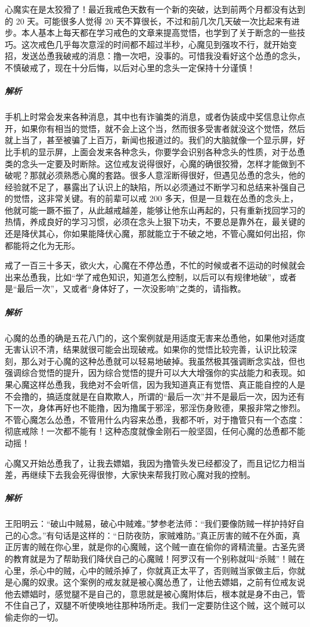 \begin{case}[脑中的短信]
    心魔实在是太狡猾了！最近我戒色天数有一个新的突破，达到前两个月都没有达到的 20 天。可能很多人觉得 20 天不算很长，不过和前几次几天破一次比起来有进步。本人基本上每天都在学习戒色的文章来提高觉悟，也学到了关于断念的一些技巧。这次戒色几乎每次意淫的时间都不超过半秒，心魔见到强攻不行，就开始变招，发送怂恿我破戒的消息：撸一次吧，没事的。可惜我没看好这个怂恿的念头，不慎破戒了，现在十分后悔，以后对心里的念头一定保持十分谨慎！
    \subparagraph{解析} 手机上时常会发来各种消息，其中也有诈骗类的消息，或者伪装成中奖信息让你点开，如果你有相当的觉悟，就不会上这个当，然而很多受害者就没这个觉悟，然后就上当了，甚至被骗了上百万，新闻也报道过的。我们的大脑就像一个显示屏，好比手机的显示屏，上面会发来各种念头，你要学会识别各种念头的性质，对于怂恿类的念头一定要及时断除。这位戒友说得很好，心魔的确很狡猾，怎样才能做到不破呢？那就必须熟悉心魔的套路。很多人意淫断得很好，但遇见怂恿的念头，他的经验就不足了，暴露出了认识上的缺陷，所以必须通过不断学习和总结来补强自己的觉悟，这非常关键。有的前辈可以戒 200 多天，但是一旦栽在怂恿的念头上，他就可能一蹶不振了，从此越戒越差，能够让他东山再起的，只有重新找回学习的热情，养成良好的学习习惯，必须在念头上狠下功夫，不要总是靠外在，最关键的还是降伏其心，你如果能降伏心魔，那就能立于不破之地，不管心魔如何出招，你都能将之化为无形。
\end{case}

\begin{case}[脑中的短信]
    戒了一百三十多天，欲火大，心魔在不停怂恿，不忙的时候或者不运动的时候就会出来怂恿我，比如“学了戒色知识，知道怎么控制，以后可以有规律地破”，或者是“最后一次”，又或者“身体好了，一次没影响”之类的，请指教。
    \subparagraph{解析} 心魔的怂恿的确是五花八门的，这个案例就是用适度无害来怂恿他，如果他对适度无害认识不清，结果就很可能会出现破戒。如果你的觉悟比较完善，认识比较深刻，那么对于心魔的这种怂恿就可以轻易地破掉。我虽然极其强调断念实战，但也强调综合觉悟的提升，因为综合觉悟的提升可以大大增强你的实战能力和表现。如果心魔这样怂恿我，我绝对不会听信，因为我知道真正有觉悟、真正能自控的人是不会撸的，搞适度就是在自欺欺人，所谓的“最后一次”并不是最后一次，因为还有下一次，身体再好也不能撸，因为撸属于邪淫，邪淫伤身败德，果报非常之惨烈。不管心魔怎么怂恿，不管用什么内容来怂恿，我都不听，对于撸管只有一个态度：彻底戒除！一次都不能有！这种态度就像金刚石一般坚固，任何心魔的怂恿都不能动摇！
\end{case}

\begin{case}[破心中贼]
    心魔又开始怂恿我了，让我去嫖娼，我因为撸管头发已经都没了，而且记忆力相当差，再继续下去我会死得很惨，大家快来帮我打败心魔对我的控制。
    \subparagraph{解析} 王阳明云：“破山中贼易，破心中贼难。”梦参老法师：“我们要像防贼一样护持好自己的心念。”有句话是这样的：“日防夜防，家贼难防。”真正厉害的贼不在外面，真正厉害的贼在你心里，就是你的心魔贼，这个贼一直在偷你的肾精流量。古圣先贤的教育就是为了帮助我们降伏自己的心魔贼！阿罗汉有一个别称就叫“杀贼”！贼在心里，杀心中的贼，心中的贼杀掉了，你就真正太平了，否则贼当家做主后，你就是心魔的奴隶。这个案例的戒友就是被心魔怂恿了，让他去嫖娼，之前有位戒友说他去嫖娼时，感觉腿不是自己的，意思就是被心魔附体后，根本就是身不由己，管不住自己了，双腿不听使唤地往那种场所走。我们一定要防住这个贼，这个贼可以偷走你的一切。
\end{case}

